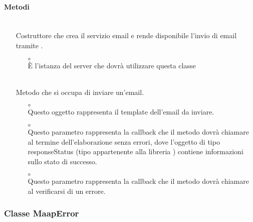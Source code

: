 \paragraph*{Metodi}
\begin{itemize}
\item[]  \\ Costruttore che crea il servizio email e rende disponibile l'invio di email tramite .
\begin{itemize}\addtolength{\itemsep}{-0.5\baselineskip}
\item[$\circ$]  \\ È l'istanza del server che dovrà utilizzare questa classe
\end{itemize}
\item[]  \\ Metodo che si occupa di inviare un'email.
\begin{itemize}\addtolength{\itemsep}{-0.5\baselineskip}
\item[$\circ$]  \\ Questo oggetto rappresenta il template dell'email da inviare.
\item[$\circ$]  \\ Questo parametro rappresenta la callback che il metodo dovrà chiamare al termine dell'elaborazione senza errori, dove l'oggetto di tipo responseStatus (tipo appartenente alla libreria ) contiene informazioni sullo stato di successo.
\item[$\circ$]  \\ Questo parametro rappresenta la callback che il metodo dovrà chiamare al verificarsi di un errore.
\end{itemize}
\end{itemize}

\subsubsection{Classe MaapError}

